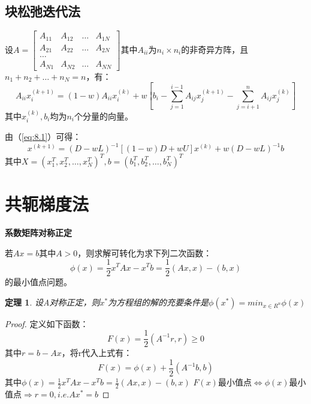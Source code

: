\documentclass[a4paper]{article}
\newtheorem{theorem}{定理}[section]
\begin{document}
\subsection{块松弛迭代法}
设$A=\left[\begin{matrix}
  A_{11} & A_{12} & \dots & A_{1N} \\
  A_{21} & A_{22} & \dots & A_{2N} \\
  \dots \\
  A_{N1} & A_{N2} & \dots & A_{NN}
\end{matrix}\right]$其中$A_{ii}$为$n_i\times n_i $的非奇异方阵，且$n_1+n_2+\dots+n_N=n$，有：
\begin{equation}
  A_{ii}x_i^{(k+1)} = (1-w)A_{ii}x_i^{(k)}+w[b_i-\sum^{i-1}_{j=1}A_{ij}x^{(k+1)}_j-\sum^n_{j=i+1}A_{ij}x^{(k)}_j]
  \label{eq:8.1}
\end{equation}
其中$x_i^{(k)}, b_i$均为$n_i$个分量的向量。

由（\ref{eq:8.1}）可得：
$$x^{(k+1)}=(D-wL)^{-1}[(1-w)D+wU]x^{(k)}+w(D-wL)^{-1}b $$
其中$X=(x_1^T, x_2^T, \dots, x^T_N)^T, b=(b_1^T, b_2^T, \dots, b_N^T)^T$

\section{共轭梯度法}
\textbf{系数矩阵对称正定}

若$Ax=b$其中$A>0$，则求解可转化为求下列二次函数：
\begin{equation}
  \phi(x)=\frac{1}{2}x^TAx-x^Tb=\frac{1}{2}(Ax,x)-(b,x) 
\end{equation}
的最小值点问题。

\begin{theorem}
  设A对称正定，则$x^*$为方程组的解的充要条件是$\phi(x^*)=min_{x\in R^n}\phi(x) $
\end{theorem}
\begin{proof}
  定义如下函数：
  $$F(x)=\frac{1}{2}(A^{-1}r, r)\ge 0 $$
  其中$r=b-Ax$，将r代入上式有：
  $$F(x)=\phi(x)+\frac{1}{2}(A^{-1}b,b) $$
  其中$\phi(x)=\frac{1}{2}x^TAx-x^Tb=\frac{1}{2}(Ax,x)-(b,x) $
  $F(x)$最小值点$\Leftrightarrow$$\phi(x)$最小值点$\Rightarrow r=0, i.e. Ax^*=b$
\end{proof}
\end{document}

